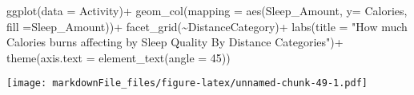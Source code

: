 \documentclass[
]{article}
\newenvironment{Shaded}{\begin{snugshade}}{\end{snugshade}}
\newcommand{\AttributeTok}[1]{\textcolor[rgb]{0.77,0.63,0.00}{#1}}
\newcommand{\DecValTok}[1]{\textcolor[rgb]{0.00,0.00,0.81}{#1}}
\newcommand{\FunctionTok}[1]{\textcolor[rgb]{0.00,0.00,0.00}{#1}}
\newcommand{\NormalTok}[1]{#1}
\newcommand{\OtherTok}[1]{\textcolor[rgb]{0.56,0.35,0.01}{#1}}
\newcommand{\SpecialCharTok}[1]{\textcolor[rgb]{0.00,0.00,0.00}{#1}}
\newcommand{\StringTok}[1]{\textcolor[rgb]{0.31,0.60,0.02}{#1}}
\begin{document}
\begin{Shaded}
\end{Shaded}

\begin{Shaded}
\begin{Highlighting}[]
\FunctionTok{ggplot}\NormalTok{(}\AttributeTok{data =}\NormalTok{ Activity)}\SpecialCharTok{+}
  \FunctionTok{geom\_col}\NormalTok{(}\AttributeTok{mapping =} \FunctionTok{aes}\NormalTok{(Sleep\_Amount, }\AttributeTok{y=}\NormalTok{ Calories, }\AttributeTok{fill =}\NormalTok{Sleep\_Amount))}\SpecialCharTok{+}
  \FunctionTok{facet\_grid}\NormalTok{(}\SpecialCharTok{\textasciitilde{}}\NormalTok{DistanceCategory)}\SpecialCharTok{+}
  \FunctionTok{labs}\NormalTok{(}\AttributeTok{title =} \StringTok{"How much Calories burns affecting by Sleep Quality By Distance Categories"}\NormalTok{)}\SpecialCharTok{+}
  \FunctionTok{theme}\NormalTok{(}\AttributeTok{axis.text =} \FunctionTok{element\_text}\NormalTok{(}\AttributeTok{angle =} \DecValTok{45}\NormalTok{))}
\end{Highlighting}
\end{Shaded}

\texttt{[image: markdownFile\_files/figure-latex/unnamed-chunk-49-1.pdf]}
\end{document}
